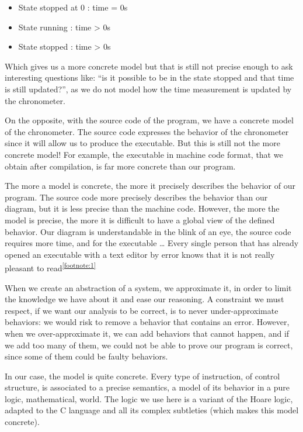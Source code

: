 \begin{itemize}
\item State stopped at 0 : time = 0s
\item State running : time > 0s
\item State stopped : time > 0s
\end{itemize}



Which gives us a more concrete model but that is still not precise
enough to ask interesting questions like: ``is it possible to be in the
state stopped and that time is still updated?'', as we do not model how
the time measurement is updated by the chronometer.



On the opposite, with the source code of the program, we have a concrete
model of the chronometer. The source code expresses the behavior of the
chronometer since it will allow us to produce the executable. But this
is still not the more concrete model! For example, the executable in
machine code format, that we obtain after compilation, is far more
concrete than our program.



The more a model is concrete, the more it precisely describes the
behavior of our program. The source code more precisely describes the
behavior than our diagram, but it is less precise than the machine code.
However, the more the model is precise, the more it is difficult to have
a global view of the defined behavior. Our diagram is understandable in
the blink of an eye, the source code requires more time, and for the
executable \ldots{} Every single person that has already opened an
executable with a text editor by error knows that it is not really
pleasant to read\textsuperscript{\ref{footnote:1}}



When we create an abstraction of a system, we approximate it, in order
to limit the knowledge we have about it and ease our reasoning. A
constraint we must respect, if we want our analysis to be correct, is to
never under-approximate behaviors: we would risk to remove a behavior
that contains an error. However, when we over-approximate it, we can add
behaviors that cannot happen, and if we add too many of them, we could
not be able to prove our program is correct, since some of them could be
faulty behaviors.



In our case, the model is quite concrete. Every type of instruction, of
control structure, is associated to a precise semantics, a model of its
behavior in a pure logic, mathematical, world. The logic we use here is
a variant of the Hoare logic, adapted to the C language and all its
complex subtleties (which makes this model concrete).

